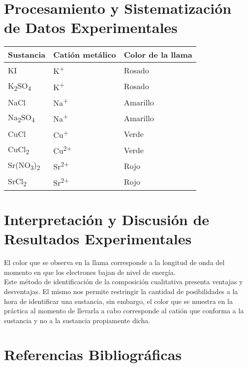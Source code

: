\documentclass{article}
\begin{document}
\section{Procesamiento y Sistematización de Datos Experimentales}

\begin{table}[H]
\begin{tabular}{|l|l|l|}
\hline
\rowcolor[HTML]{D9D9D9} 
Sustancia & Catión metálico & Color de la llama \\ \hline
\cellcolor[HTML]{FFFFFF}KI & K\textsuperscript{+} & Rosado \\ \hline
K\textsubscript{2}SO\textsubscript{4} & K\textsuperscript{+} & Rosado \\ \hline
NaCl & Na\textsuperscript{+} & Amarillo \\ \hline
Na\textsubscript{2}SO\textsubscript{4} & Na\textsuperscript{+} & Amarillo \\ \hline
CuCl & Cu\textsuperscript{+} & Verde \\ \hline
CuCl\textsubscript{2} & Cu\textsuperscript{2+} & Verde \\ \hline
Sr(NO\textsubscript{3})\textsubscript{2} & Sr\textsuperscript{2+} & Rojo \\ \hline
SrCl\textsubscript{2} & Sr\textsuperscript{2+} & Rojo \\ \hline
\end{tabular}
\end{table}

\section{Interpretación y Discusión de Resultados Experimentales}

El color que se observa en la llama corresponde a la longitud de onda del momento en que los electrones bajan de nivel de energía.\\

Este método de identificación de la composición cualitativa presenta ventajas y desventajas. El mismo nos permite restringir la cantidad de posibilidades a la hora de identificar una sustancia, sin embargo, el color que se muestra en la práctica al momento de llevarla a cabo corresponde al catión que conforma a la sustancia y no a la sustancia propiamente dicha.  


\pagebreak

\section{Referencias Bibliográficas}
\end{document}

